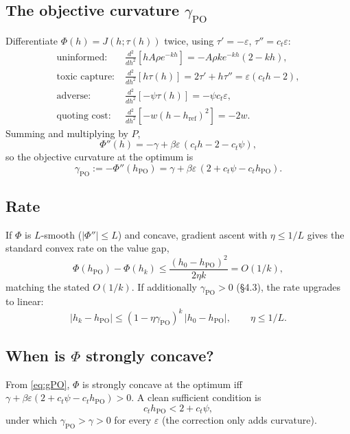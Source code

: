 \documentclass[11pt]{article}
\newcommand{\eps}{\varepsilon}
\newcommand{\href}{h_{\mathrm{ref}}}
\newcommand{\hPO}{h_{\mathrm{PO}}}
\newcommand{\gPO}{\gamma_{\mathrm{PO}}}
\begin{document}
\subsection{The objective curvature $\gPO$}
Differentiate $\Phi(h)=J(h;\tau(h))$ twice, using $\tau'=-\eps$,
$\tau''=c_t\eps$:
%
\begin{align*}
  \text{uninformed:}\;& \tfrac{d^2}{dh^2}[hA\rho e^{-kh}] = -A\rho k e^{-kh}(2-kh),\\
  \text{toxic capture:}\;& \tfrac{d^2}{dh^2}[h\tau(h)] = 2\tau'+h\tau'' = \eps(c_t h-2),\\
  \text{adverse:}\;& \tfrac{d^2}{dh^2}[-\psi\tau(h)] = -\psi c_t\eps,\\
  \text{quoting cost:}\;& \tfrac{d^2}{dh^2}[-w(h-\href)^2] = -2w.
\end{align*}
%
Summing and multiplying by $P$,
%
\begin{equation*}
  \Phi''(h) = -\gamma + \beta\eps\,(c_t h - 2 - c_t\psi),
\end{equation*}
%
so the objective curvature at the optimum is
%
\begin{equation}\label{eq:gPO}
  \boxed{\;
  \gPO := -\Phi''(\hPO) = \gamma + \beta\eps\,(2 + c_t\psi - c_t\hPO).
  \;}
\end{equation}

\subsection{Rate}
If $\Phi$ is $L$-smooth ($|\Phi''|\le L$) and concave, gradient ascent with
$\eta\le 1/L$ gives the standard convex rate on the value gap,
%
\begin{equation*}
  \Phi(\hPO)-\Phi(h_k) \le \frac{(h_0-\hPO)^2}{2\eta k} = O(1/k),
\end{equation*}
%
matching the stated $O(1/k)$. If additionally $\gPO>0$ (\S4.3), the rate upgrades
to linear:
%
\begin{equation*}
  |h_k-\hPO| \le (1-\eta\gPO)^k\,|h_0-\hPO|,\qquad \eta\le 1/L.
\end{equation*}

\subsection{When is $\Phi$ strongly concave?}
From \eqref{eq:gPO}, $\Phi$ is strongly concave at the optimum iff
$\gamma+\beta\eps(2+c_t\psi-c_t\hPO)>0$. A clean sufficient condition is
%
\begin{equation*}
  c_t\hPO < 2 + c_t\psi,
\end{equation*}
%
under which $\gPO>\gamma>0$ for every $\eps$ (the correction only adds curvature).
\end{document}
